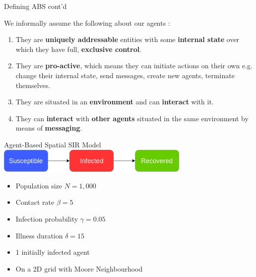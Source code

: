 \documentclass{beamer} %
\begin{document}
\begin{frame}{Defining ABS cont'd}
  \begin{block}{}
    We informally assume the following about our agents \cite{macal_everything_2016, odell_objects_2002, siebers_introduction_2008, wooldridge_introduction_2009}:
  \end{block}
  
  \begin{enumerate}
    \item They are \textbf{uniquely addressable} entities with some \textbf{internal state} over which they have full, \textbf{exclusive control}.
	\item They are \textbf{pro-active}, which means they can initiate actions on their own e.g. change their internal state, send messages, create new agents, terminate themselves.
	\item They are situated in an \textbf{environment} and can \textbf{interact} with it.
	\item They can \textbf{interact} with \textbf{other agents} situated in the same environment by means of \textbf{messaging}.
  \end{enumerate}
\end{frame}

\begin{frame}{Agent-Based Spatial SIR Model}
  \includegraphics[width=0.7\textwidth]{./fig/SIR_transitions.png}
  
  \begin{itemize}
    \item Population size $N = 1,000$
 	\item Contact rate $\beta = 5$
 	\item Infection probability $\gamma = 0.05$
 	\item Illness duration $\delta = 15$
 	\item 1 initially infected agent
 	\item On a 2D grid with Moore Neighbourhood
  \end{itemize}
\end{frame}
\end{document}
